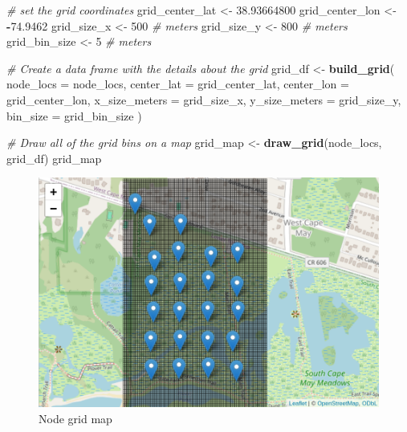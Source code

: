\documentclass[
]{book}
\newenvironment{Shaded}{\begin{snugshade}}{\end{snugshade}}
\newcommand{\AttributeTok}[1]{\textcolor[rgb]{0.13,0.29,0.53}{#1}}
\newcommand{\CommentTok}[1]{\textcolor[rgb]{0.56,0.35,0.01}{\textit{#1}}}
\newcommand{\DecValTok}[1]{\textcolor[rgb]{0.00,0.00,0.81}{#1}}
\newcommand{\FloatTok}[1]{\textcolor[rgb]{0.00,0.00,0.81}{#1}}
\newcommand{\FunctionTok}[1]{\textcolor[rgb]{0.13,0.29,0.53}{\textbf{#1}}}
\newcommand{\NormalTok}[1]{#1}
\newcommand{\OtherTok}[1]{\textcolor[rgb]{0.56,0.35,0.01}{#1}}
\newcommand{\SpecialCharTok}[1]{\textcolor[rgb]{0.81,0.36,0.00}{\textbf{#1}}}
\begin{document}
\begin{Shaded}
\begin{Highlighting}[]
\CommentTok{\# set the grid coordinates}
\NormalTok{grid\_center\_lat }\OtherTok{\textless{}{-}} \FloatTok{38.93664800}
\NormalTok{grid\_center\_lon }\OtherTok{\textless{}{-}} \SpecialCharTok{{-}}\FloatTok{74.9462}
\NormalTok{grid\_size\_x }\OtherTok{\textless{}{-}} \DecValTok{500} \CommentTok{\# meters}
\NormalTok{grid\_size\_y }\OtherTok{\textless{}{-}} \DecValTok{800} \CommentTok{\# meters}
\NormalTok{grid\_bin\_size }\OtherTok{\textless{}{-}} \DecValTok{5} \CommentTok{\# meters}

\CommentTok{\# Create a data frame with the details about the grid}
\NormalTok{grid\_df }\OtherTok{\textless{}{-}} \FunctionTok{build\_grid}\NormalTok{(}
  \AttributeTok{node\_locs =}\NormalTok{ node\_locs,}
  \AttributeTok{center\_lat =}\NormalTok{ grid\_center\_lat,}
  \AttributeTok{center\_lon =}\NormalTok{ grid\_center\_lon,}
  \AttributeTok{x\_size\_meters =}\NormalTok{ grid\_size\_x,}
  \AttributeTok{y\_size\_meters =}\NormalTok{ grid\_size\_y,}
  \AttributeTok{bin\_size =}\NormalTok{ grid\_bin\_size}
\NormalTok{)}

\CommentTok{\# Draw all of the grid bins on a map}
\NormalTok{grid\_map }\OtherTok{\textless{}{-}} \FunctionTok{draw\_grid}\NormalTok{(node\_locs, grid\_df)}
\NormalTok{grid\_map}
\end{Highlighting}
\end{Shaded}

\begin{figure}
\centering
\includegraphics{images/habitat_use_grid_map.png}
\caption{Node grid map}
\end{figure}
\end{document}
